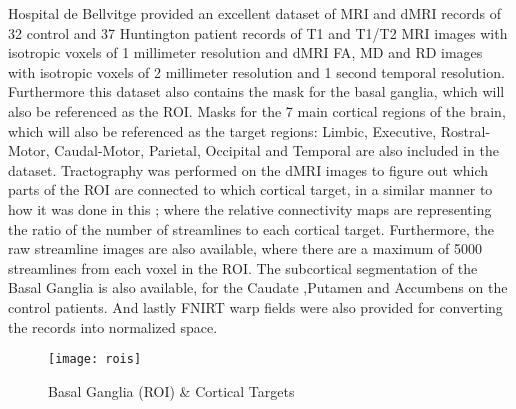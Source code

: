  \par

Hospital de Bellvitge provided an excellent dataset of \ac{MRI} and \ac{dMRI} records of 32 control and 37 Huntington patient records of T1 and T1/T2 \ac{MRI} images with isotropic voxels of 1 millimeter resolution and \ac{dMRI} \ac{FA}, \ac{MD} and \ac{RD} images with isotropic voxels of 2 millimeter resolution and 1 second temporal resolution. Furthermore this dataset also contains the mask for the basal ganglia, which will also be referenced as the \ac{ROI}. Masks for the 7 main cortical regions of the brain, which will also be referenced as the target regions: Limbic, Executive, Rostral-Motor, Caudal-Motor, Parietal, Occipital and Temporal are also included in the dataset. Tractography was performed on the \ac{dMRI} images to figure out which parts of the \ac{ROI} are connected to which cortical target, in a similar manner to how it was done in this ; where the relative connectivity maps are representing the ratio of the number of streamlines to each cortical target. Furthermore, the raw streamline images are also available, where there are a maximum of 5000 streamlines from each voxel in the \ac{ROI}. The subcortical segmentation of the Basal Ganglia is also available, for the Caudate ,Putamen and Accumbens on the control patients. And lastly \ac{FNIRT} warp fields were also provided for converting the records into normalized space.\par

\begin{figure}[H]
\centering
\texttt{[image: rois]}
\caption{Basal Ganglia (ROI) \& Cortical Targets}
\label{fig:rois}
\end{figure}


